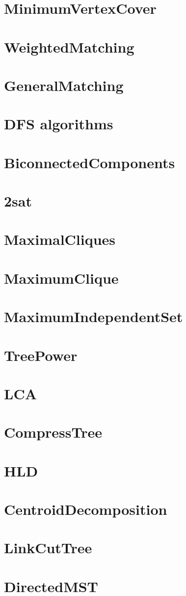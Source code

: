 \section{MinimumVertexCover}
\section{WeightedMatching}
\section{GeneralMatching}

\section{DFS algorithms}
\section{BiconnectedComponents}
\section{2sat}

\section{MaximalCliques}
\section{MaximumClique}
\section{MaximumIndependentSet}

\section{TreePower}
\section{LCA}
\section{CompressTree}
\section{HLD}
\section{CentroidDecomposition}
\section{LinkCutTree}
\section{DirectedMST}
